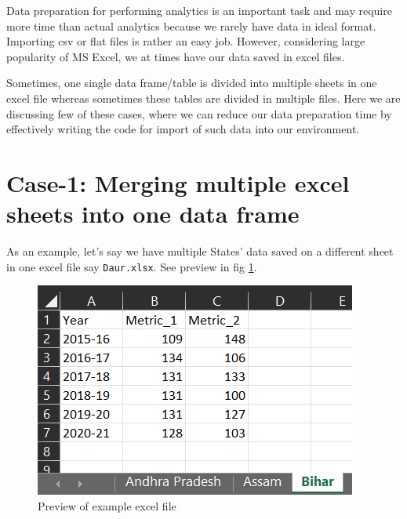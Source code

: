 \documentclass[
]{book}
\begin{document}
Data preparation for performing analytics is an important task and may require more time than actual analytics because we rarely have data in ideal format. Importing csv or flat files is rather an easy job. However, considering large popularity of MS Excel, we at times have our data saved in excel files.

Sometimes, one single data frame/table is divided into multiple sheets in one excel file whereas sometimes these tables are divided in multiple files. Here we are discussing few of these cases, where we can reduce our data preparation time by effectively writing the code for import of such data into our environment.

\hypertarget{case-1-merging-multiple-excel-sheets-into-one-data-frame}{%
\section{\texorpdfstring{\textbf{Case-1}: Merging multiple excel sheets into one data frame}{Case-1: Merging multiple excel sheets into one data frame}}\label{case-1-merging-multiple-excel-sheets-into-one-data-frame}}

As an example, let's say we have multiple States' data saved on a different sheet in one excel file say \texttt{Daur.xlsx}. See preview in fig \ref{fig:prevexcel}.

\begin{figure}

{\centering \includegraphics[width=1\linewidth]{images/excel} 

}

\caption{Preview of example excel file}\label{fig:prevexcel}
\end{figure}
\end{document}
